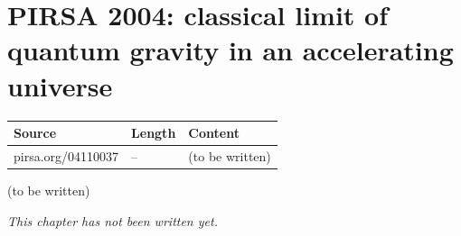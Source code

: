 \chapter{PIRSA 2004: classical limit of quantum gravity in an accelerating universe}\label{ch:c35}
\begin{paracol}{2}

\begin{sources}
\begin{tabularx}{\linewidth}{@{}l l L@{}}
\toprule
\textbf{Source} & \textbf{Length} & \textbf{Content}\\
\midrule
pirsa.org/04110037 & -- & (to be written)\\
\bottomrule
\end{tabularx}

\end{sources}

\begin{reading}
(to be written)
\end{reading}

\emph{This chapter has not been written yet.}

\flushside
\end{paracol}
